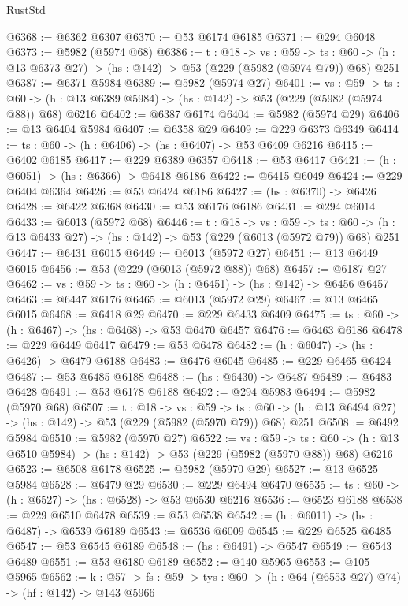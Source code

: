 \begin{lexlean}{RustStd}
\begin{coremodule}
@6368 := @6362 @6307
@6370 := @53 @6174 @6185
@6371 := @294 @6048
@6373 := @5982 (@5974 @68)
@6386 := {t : @18} ->
  {vs : @59} ->
  {ts : @60} -> (h : @13 @6373 @27) -> (hs : @142) -> @53 (@229 (@5982 (@5974 @79)) @68) @251
@6387 := @6371 @5984
@6389 := @5982 (@5974 @27)
@6401 := {vs : @59} ->
  {ts : @60} -> (h : @13 @6389 @5984) -> (hs : @142) -> @53 (@229 (@5982 (@5974 @88)) @68) @6216
@6402 := @6387 @6174
@6404 := @5982 (@5974 @29)
@6406 := @13 @6404 @5984
@6407 := @6358 @29
@6409 := @229 @6373 @6349
@6414 := {ts : @60} -> (h : @6406) -> (hs : @6407) -> @53 @6409 @6216
@6415 := @6402 @6185
@6417 := @229 @6389 @6357
@6418 := @53 @6417
@6421 := (h : @6051) -> (hs : @6366) -> @6418 @6186
@6422 := @6415 @6049
@6424 := @229 @6404 @6364
@6426 := @53 @6424 @6186
@6427 := (hs : @6370) -> @6426
@6428 := @6422 @6368
@6430 := @53 @6176 @6186
@6431 := @294 @6014
@6433 := @6013 (@5972 @68)
@6446 := {t : @18} ->
  {vs : @59} ->
  {ts : @60} -> (h : @13 @6433 @27) -> (hs : @142) -> @53 (@229 (@6013 (@5972 @79)) @68) @251
@6447 := @6431 @6015
@6449 := @6013 (@5972 @27)
@6451 := @13 @6449 @6015
@6456 := @53 (@229 (@6013 (@5972 @88)) @68)
@6457 := @6187 @27
@6462 := {vs : @59} -> {ts : @60} -> (h : @6451) -> (hs : @142) -> @6456 @6457
@6463 := @6447 @6176
@6465 := @6013 (@5972 @29)
@6467 := @13 @6465 @6015
@6468 := @6418 @29
@6470 := @229 @6433 @6409
@6475 := {ts : @60} -> (h : @6467) -> (hs : @6468) -> @53 @6470 @6457
@6476 := @6463 @6186
@6478 := @229 @6449 @6417
@6479 := @53 @6478
@6482 := (h : @6047) -> (hs : @6426) -> @6479 @6188
@6483 := @6476 @6045
@6485 := @229 @6465 @6424
@6487 := @53 @6485 @6188
@6488 := (hs : @6430) -> @6487
@6489 := @6483 @6428
@6491 := @53 @6178 @6188
@6492 := @294 @5983
@6494 := @5982 (@5970 @68)
@6507 := {t : @18} ->
  {vs : @59} ->
  {ts : @60} -> (h : @13 @6494 @27) -> (hs : @142) -> @53 (@229 (@5982 (@5970 @79)) @68) @251
@6508 := @6492 @5984
@6510 := @5982 (@5970 @27)
@6522 := {vs : @59} ->
  {ts : @60} -> (h : @13 @6510 @5984) -> (hs : @142) -> @53 (@229 (@5982 (@5970 @88)) @68) @6216
@6523 := @6508 @6178
@6525 := @5982 (@5970 @29)
@6527 := @13 @6525 @5984
@6528 := @6479 @29
@6530 := @229 @6494 @6470
@6535 := {ts : @60} -> (h : @6527) -> (hs : @6528) -> @53 @6530 @6216
@6536 := @6523 @6188
@6538 := @229 @6510 @6478
@6539 := @53 @6538
@6542 := (h : @6011) -> (hs : @6487) -> @6539 @6189
@6543 := @6536 @6009
@6545 := @229 @6525 @6485
@6547 := @53 @6545 @6189
@6548 := (hs : @6491) -> @6547
@6549 := @6543 @6489
@6551 := @53 @6180 @6189
@6552 := @140 @5965
@6553 := @105 @5965
@6562 := {k : @57} ->
  {fs : @59} -> {tys : @60} -> (h : @64 (@6553 @27) @74) -> (hf : @142) -> @143 @5966

\end{coremodule}
\end{lexlean}
